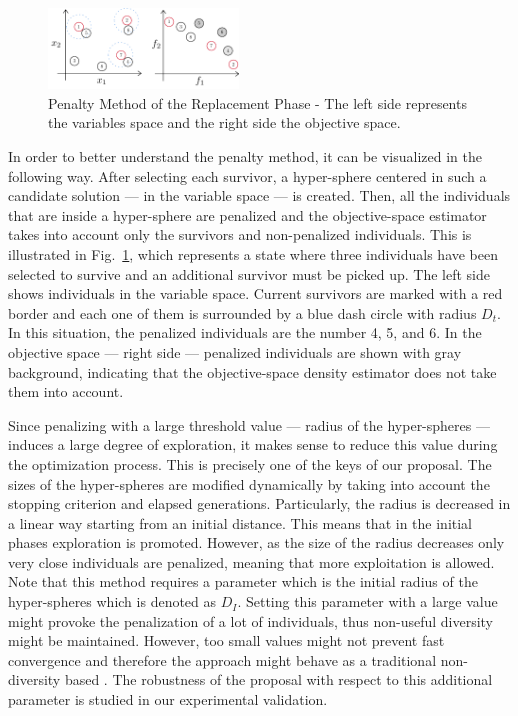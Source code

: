 \begin{figure}[t]
\centering
%
%
\includegraphics[width=0.45\textwidth]{Images/Diagram.pdf}
\caption{Penalty Method of the Replacement Phase - The left side represents the variables space and the right side the 
objective space.} \label{fig:Hypersphere}
\end{figure}



In order to better understand the penalty method, it can be visualized in the following way.
%
After selecting each survivor, a hyper-sphere 
centered in such a candidate solution --- in the variable space --- is created.
%
Then, all the individuals that are inside a hyper-sphere are penalized and the objective-space estimator takes 
into account only the survivors and non-penalized individuals.
%
This is illustrated in Fig.~\ref{fig:Hypersphere}, which represents a state where three individuals have been 
selected to survive and an additional survivor must be picked up.
%
The left side shows individuals in the variable space.
%
Current survivors are marked with a red border and each one of them is surrounded by a blue dash circle with 
radius $D_t$.
%
In this situation, the penalized individuals are the number 4, 5, and 6.
%
In the objective space --- right side --- penalized individuals are shown with gray background, indicating
that the objective-space density estimator does not take them into account.

Since penalizing with a large threshold value --- radius of the hyper-spheres --- induces a large degree of 
exploration, it makes sense to reduce this value during the optimization process.
%
This is precisely one of the keys of our proposal.
%
The sizes of the hyper-spheres are modified dynamically by taking into account the stopping 
criterion and elapsed generations.
%
Particularly, the radius is decreased in a linear way starting from an initial distance.
%
This means that in the initial phases exploration is promoted.
%
However, as the size of the radius decreases only very close individuals are penalized, meaning that more 
exploitation is allowed.
%
Note that this method requires a parameter which is the initial radius of the hyper-spheres which is denoted as $D_I$. 
%
Setting this parameter with a large value might provoke the penalization of a lot of individuals,
thus non-useful diversity might be maintained.
%
However, too small values might not prevent fast convergence and therefore the approach  
might behave as a traditional non-diversity based \MOEA{}.
%
The robustness of the proposal with respect to this additional parameter is studied in our experimental validation.

